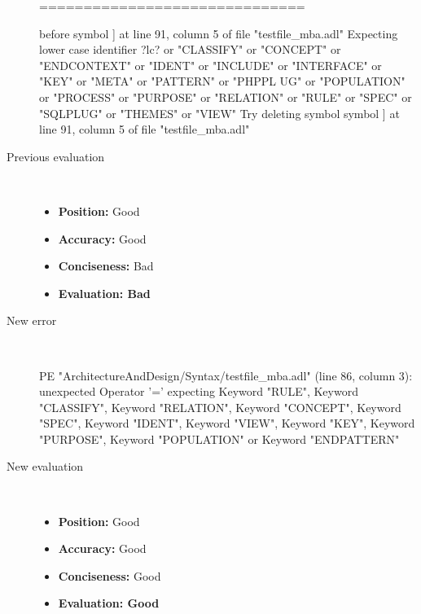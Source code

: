 \begin{description}
\begin{haskell}
==============================

before symbol ] at line 91, column 5 of file "testfile_mba.adl"
Expecting lower case identifier ?lc? or "CLASSIFY" or "CONCEPT" or "ENDCONTEXT"
or "IDENT" or "INCLUDE" or "INTERFACE" or "KEY" or "META" or "PATTERN" or "PHPPL
UG" or "POPULATION" or "PROCESS" or "PURPOSE" or "RELATION" or "RULE" or "SPEC"
or "SQLPLUG" or "THEMES" or "VIEW"
Try deleting symbol symbol ] at line 91, column 5 of file "testfile_mba.adl"
\end{haskell}
  \item[Previous evaluation]~\\
    \begin{itemize}
    \item \textbf{Position:} Good
    \item \textbf{Accuracy:} Good
    \item \textbf{Conciseness:} Bad
    \item \textbf{Evaluation: Bad}
    \end{itemize}
  \item[New error]~\\
\begin{haskell}
PE "ArchitectureAndDesign/Syntax/testfile_mba.adl" (line 86, column 3):
unexpected Operator '='
expecting Keyword "RULE", Keyword "CLASSIFY", Keyword "RELATION", Keyword "CONCEPT", Keyword "SPEC", Keyword "IDENT", Keyword "VIEW", Keyword "KEY", Keyword "PURPOSE", Keyword "POPULATION" or Keyword "ENDPATTERN"\end{haskell}
  \item[New evaluation]~\\
    \begin{itemize}
    \item \textbf{Position:} Good
    \item \textbf{Accuracy:} Good
    \item \textbf{Conciseness:} Good
    \item \textbf{Evaluation: Good}
    \end{itemize}
  \end{description}

\hrulefill

